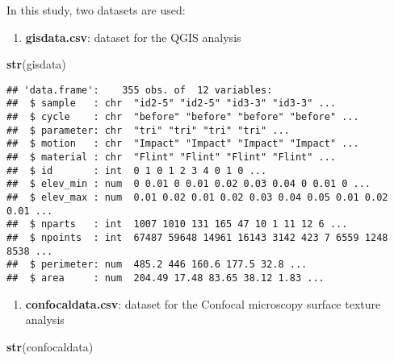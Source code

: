 \documentclass[
]{article}
\newenvironment{Shaded}{\begin{snugshade}}{\end{snugshade}}
\newcommand{\KeywordTok}[1]{\textcolor[rgb]{0.13,0.29,0.53}{\textbf{#1}}}
\newcommand{\NormalTok}[1]{#1}
\providecommand{\tightlist}{%
  \setlength{\itemsep}{0pt}\setlength{\parskip}{0pt}}
\begin{document}
In this study, two datasets are used:

\begin{enumerate}
\def\labelenumi{\arabic{enumi})}
\tightlist
\item
  \textbf{gisdata.csv}: dataset for the QGIS analysis
\end{enumerate}

\begin{Shaded}
\begin{Highlighting}[]
\KeywordTok{str}\NormalTok{(gisdata)}
\end{Highlighting}
\end{Shaded}

\begin{verbatim}
## 'data.frame':    355 obs. of  12 variables:
##  $ sample   : chr  "id2-5" "id2-5" "id3-3" "id3-3" ...
##  $ cycle    : chr  "before" "before" "before" "before" ...
##  $ parameter: chr  "tri" "tri" "tri" "tri" ...
##  $ motion   : chr  "Impact" "Impact" "Impact" "Impact" ...
##  $ material : chr  "Flint" "Flint" "Flint" "Flint" ...
##  $ id       : int  0 1 0 1 2 3 4 0 1 0 ...
##  $ elev_min : num  0 0.01 0 0.01 0.02 0.03 0.04 0 0.01 0 ...
##  $ elev_max : num  0.01 0.02 0.01 0.02 0.03 0.04 0.05 0.01 0.02 0.01 ...
##  $ nparts   : int  1007 1010 131 165 47 10 1 11 12 6 ...
##  $ npoints  : int  67487 59648 14961 16143 3142 423 7 6559 1248 8538 ...
##  $ perimeter: num  485.2 446 160.6 177.5 32.8 ...
##  $ area     : num  204.49 17.48 83.65 38.12 1.83 ...
\end{verbatim}

\begin{enumerate}
\def\labelenumi{\arabic{enumi})}
\setcounter{enumi}{1}
\tightlist
\item
  \textbf{confocaldata.csv}: dataset for the Confocal microscopy surface
  texture analysis
\end{enumerate}

\begin{Shaded}
\begin{Highlighting}[]
\KeywordTok{str}\NormalTok{(confocaldata)}
\end{Highlighting}
\end{Shaded}
\end{document}
